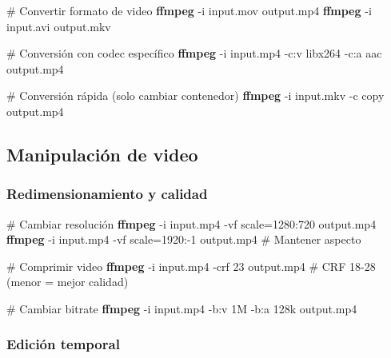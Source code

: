 \documentclass[
  11pt,
  letterpaper,
  oneside,
  openany]{scrbook}
\newenvironment{Shaded}{}{}
\newcommand{\AttributeTok}[1]{\textcolor[rgb]{0.84,0.23,0.29}{#1}}
\newcommand{\CommentTok}[1]{\textcolor[rgb]{0.42,0.45,0.49}{#1}}
\newcommand{\ExtensionTok}[1]{\textcolor[rgb]{0.84,0.23,0.29}{\textbf{#1}}}
\newcommand{\NormalTok}[1]{\textcolor[rgb]{0.14,0.16,0.18}{#1}}
\begin{document}
\begin{Shaded}
\begin{Highlighting}[]
\CommentTok{\# Convertir formato de video}
\ExtensionTok{ffmpeg} \AttributeTok{{-}i}\NormalTok{ input.mov output.mp4}
\ExtensionTok{ffmpeg} \AttributeTok{{-}i}\NormalTok{ input.avi output.mkv}

\CommentTok{\# Conversión con codec específico}
\ExtensionTok{ffmpeg} \AttributeTok{{-}i}\NormalTok{ input.mp4 }\AttributeTok{{-}c:v}\NormalTok{ libx264 }\AttributeTok{{-}c:a}\NormalTok{ aac output.mp4}

\CommentTok{\# Conversión rápida (solo cambiar contenedor)}
\ExtensionTok{ffmpeg} \AttributeTok{{-}i}\NormalTok{ input.mkv }\AttributeTok{{-}c}\NormalTok{ copy output.mp4}
\end{Highlighting}
\end{Shaded}

\subsection{Manipulación de video}\label{manipulaciuxf3n-de-video}

\subsubsection{Redimensionamiento y
calidad}\label{redimensionamiento-y-calidad}

\begin{Shaded}
\begin{Highlighting}[]
\CommentTok{\# Cambiar resolución}
\ExtensionTok{ffmpeg} \AttributeTok{{-}i}\NormalTok{ input.mp4 }\AttributeTok{{-}vf}\NormalTok{ scale=1280:720 output.mp4}
\ExtensionTok{ffmpeg} \AttributeTok{{-}i}\NormalTok{ input.mp4 }\AttributeTok{{-}vf}\NormalTok{ scale=1920:{-}1 output.mp4  }\CommentTok{\# Mantener aspecto}

\CommentTok{\# Comprimir video}
\ExtensionTok{ffmpeg} \AttributeTok{{-}i}\NormalTok{ input.mp4 }\AttributeTok{{-}crf}\NormalTok{ 23 output.mp4  }\CommentTok{\# CRF 18{-}28 (menor = mejor calidad)}

\CommentTok{\# Cambiar bitrate}
\ExtensionTok{ffmpeg} \AttributeTok{{-}i}\NormalTok{ input.mp4 }\AttributeTok{{-}b:v}\NormalTok{ 1M }\AttributeTok{{-}b:a}\NormalTok{ 128k output.mp4}
\end{Highlighting}
\end{Shaded}

\subsubsection{Edición temporal}\label{ediciuxf3n-temporal}
\end{document}
